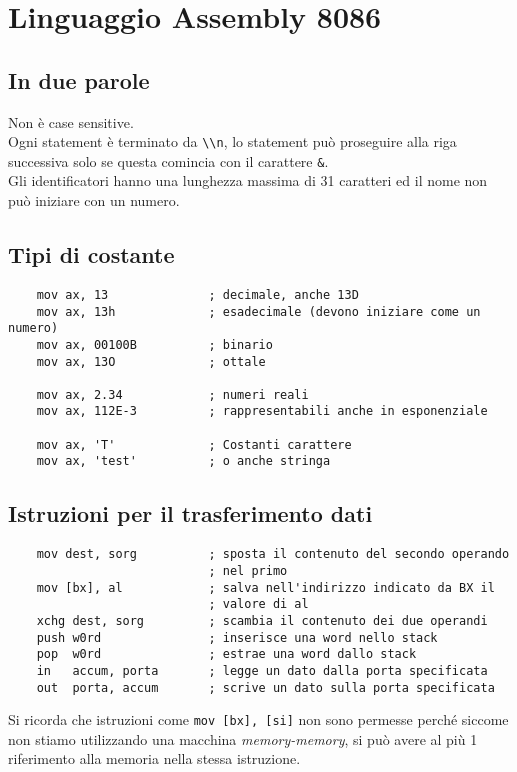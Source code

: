 \documentclass[../ace.tex]{subfiles}
\begin{document}
\section{Linguaggio Assembly 8086}
\subsection{In due parole}
Non è case sensitive.
\\
Ogni statement è terminato da \lstinline{\\n}, lo statement può proseguire alla riga successiva solo
se questa comincia con il carattere \lstinline{&}.
\\
Gli identificatori hanno una lunghezza massima di 31 caratteri ed il nome non può iniziare con un numero.

\subsection{Tipi di costante}
\begin{lstlisting}
    mov ax, 13              ; decimale, anche 13D
    mov ax, 13h             ; esadecimale (devono iniziare come un numero)
    mov ax, 00100B          ; binario
    mov ax, 13O             ; ottale

    mov ax, 2.34            ; numeri reali
    mov ax, 112E-3          ; rappresentabili anche in esponenziale

    mov ax, 'T'             ; Costanti carattere
    mov ax, 'test'          ; o anche stringa
\end{lstlisting}

\subsection{Istruzioni per il trasferimento dati}
\begin{lstlisting}
    mov dest, sorg          ; sposta il contenuto del secondo operando
                            ; nel primo
    mov [bx], al            ; salva nell'indirizzo indicato da BX il
                            ; valore di al
    xchg dest, sorg         ; scambia il contenuto dei due operandi
    push w0rd               ; inserisce una word nello stack
    pop  w0rd               ; estrae una word dallo stack
    in   accum, porta       ; legge un dato dalla porta specificata
    out  porta, accum       ; scrive un dato sulla porta specificata
\end{lstlisting}
Si ricorda che istruzioni come \lstinline{mov [bx], [si]} non sono permesse perché siccome non
stiamo utilizzando una macchina \textit{memory-memory}, si può avere al più 1 riferimento alla memoria
nella stessa istruzione.
\end{document}
